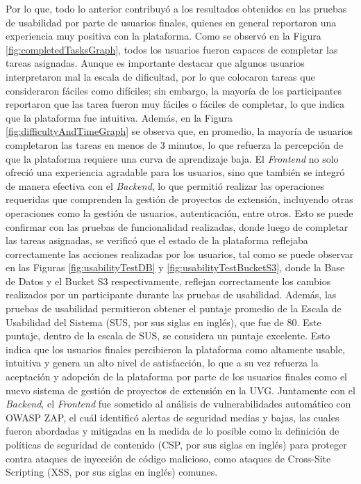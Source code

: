 Por lo que, todo lo anterior contribuyó a los resultados obtenidos en las pruebas de usabilidad por parte de usuarios
finales, quienes en general reportaron una experiencia muy positiva con la plataforma.
Como se observó en la Figura \ref{fig:completedTasksGraph}, todos los usuarios fueron capaces de completar las tareas
asignadas. Aunque es importante destacar que algunos usuarios interpretaron mal la escala de dificultad, por lo que
colocaron tareas que consideraron fáciles como difíciles; sin embargo, la mayoría de los participantes reportaron que
las tarea fueron muy fáciles o fáciles de completar, lo que indica que la plataforma fue intuitiva. Además, en la Figura
\ref{fig:difficultyAndTimeGraph} se observa que, en promedio, la mayoría de usuarios completaron las tareas en menos de
3 minutos, lo que refuerza la percepción de que la plataforma requiere una curva de aprendizaje baja.
El \textit{Frontend} no solo ofreció una experiencia agradable para los usuarios, sino que también se integró de manera
efectiva con el \textit{Backend}, lo que permitió realizar las operaciones requeridas que comprenden la gestión de
proyectos de extensión, incluyendo otras operaciones como la gestión de usuarios, autenticación, entre otros. Esto se
puede confirmar con las pruebas de funcionalidad realizadas, donde luego de completar las tareas asignadas, se verificó
que el estado de la plataforma reflejaba correctamente las acciones realizadas por los usuarios, tal como se puede observar
en las Figuras \ref{fig:usabilityTestDB} y \ref{fig:usabilityTestBucketS3}, donde la Base de Datos y el Bucket S3 respectivamente,
reflejan correctamente los cambios realizados por un participante durante las pruebas de usabilidad.
Además, las pruebas de usabilidad permitieron obtener el puntaje promedio de la Escala de Usabilidad del Sistema (SUS, por sus siglas
en inglés), que fue de 80. Este puntaje, dentro de la escala de SUS, se considera un puntaje excelente. Esto indica que los
usuarios finales percibieron la plataforma como altamente usable, intuitiva y genera un alto nivel de satisfacción, lo que a su
vez refuerza la aceptación y adopción de la plataforma por parte de los usuarios finales como el nuevo sistema de gestión de
proyectos de extensión en la UVG.
Juntamente con el \textit{Backend}, el \textit{Frontend} fue sometido al análisis de vulnerabilidades automático con OWASP ZAP,
el cuál identificó alertas de seguridad medias y bajas, las cuales fueron abordadas y mitigadas en la medida de lo posible como
la definición de políticas de seguridad de contenido (CSP, por sus siglas en inglés) para proteger contra ataques de inyección
de código malicioso, como ataques de Cross-Site Scripting (XSS, por sus siglas en inglés) comunes.

